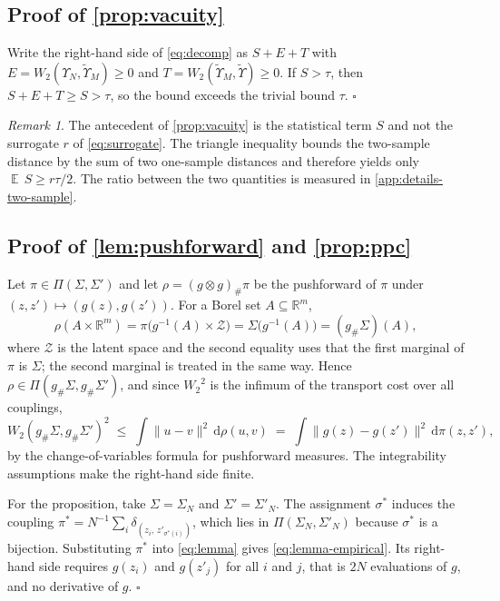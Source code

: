 \documentclass[twoside,11pt]{article}
\theoremstyle{plain}
\theoremstyle{definition}
\theoremstyle{remark}
\newtheorem{rem}{Remark}
\newcommand{\Wtwo}{\ensuremath{W_2}}
\newcommand{\UpsN}{\ensuremath{\Upsilon_{N}}}
\newcommand{\UpsT}{\ensuremath{\tilde{\Upsilon}}}
\newcommand{\UpsTM}{\ensuremath{\tilde{\Upsilon}_{M}}}
\DeclareMathOperator{\E}{\mathbb{E}}
\newcommand{\R}{\ensuremath{\mathbb{R}}}
\begin{document}
\subsection*{Proof of \cref{prop:vacuity}}

Write the right-hand side of \cref{eq:decomp} as $S + E + T$ with
$E = \Wtwo(\UpsN, \UpsTM) \geq 0$ and $T = \Wtwo(\UpsTM, \UpsT) \geq 0$. If
$S > \tau$, then $S + E + T \geq S > \tau$, so the bound exceeds the trivial
bound $\tau$. \hfill$\square$

\begin{rem}\label{rem:antecedent}
The antecedent of \cref{prop:vacuity} is the statistical term $S$ and not
the surrogate $r$ of \cref{eq:surrogate}. The triangle inequality bounds
the two-sample distance by the sum of two one-sample distances and therefore
yields only $\E\,S \geq r\tau/2$. The ratio between the two quantities is
measured in \cref{app:details-two-sample}.
\end{rem}

\subsection*{Proof of \cref{lem:pushforward} and \cref{prop:ppc}}

Let $\pi \in \Pi(\Sigma, \Sigma')$ and let $\rho = (g \otimes g)_{\#}\pi$ be the
pushforward of $\pi$ under $(z, z') \mapsto (g(z), g(z'))$. For a Borel set
$A \subseteq \R^{m}$,
\[
  \rho(A \times \R^{m})
  = \pi\bigl(g^{-1}(A) \times \mathcal{Z}\bigr)
  = \Sigma\bigl(g^{-1}(A)\bigr)
  = (g_{\#}\Sigma)(A),
\]
where $\mathcal{Z}$ is the latent space and the second equality uses that
the first marginal of $\pi$ is $\Sigma$; the second marginal is treated in
the same way. Hence $\rho \in \Pi(g_{\#}\Sigma, g_{\#}\Sigma')$, and since
$\Wtwo^{2}$ is the infimum of the transport cost over all couplings,
\[
  \Wtwo(g_{\#}\Sigma, g_{\#}\Sigma')^{2}
  \;\leq\; \int \|u - v\|^{2}\,\mathrm{d}\rho(u,v)
  \;=\; \int \|g(z) - g(z')\|^{2}\,\mathrm{d}\pi(z, z'),
\]
by the change-of-variables formula for pushforward measures. The
integrability assumptions make the right-hand side finite.

For the proposition, take $\Sigma = \Sigma_N$ and $\Sigma' = \Sigma'_N$. The assignment
$\sigma^{*}$ induces the coupling
$\pi^{*} = N^{-1}\sum_{i} \delta_{(z_i,\, z'_{\sigma^{*}(i)})}$, which lies in
$\Pi(\Sigma_N, \Sigma'_N)$ because $\sigma^{*}$ is a bijection. Substituting
$\pi^{*}$ into \cref{eq:lemma} gives \cref{eq:lemma-empirical}. Its
right-hand side requires $g(z_i)$ and $g(z'_j)$ for all $i$ and $j$, that is
$2N$ evaluations of $g$, and no derivative of $g$. \hfill$\square$
\end{document}
